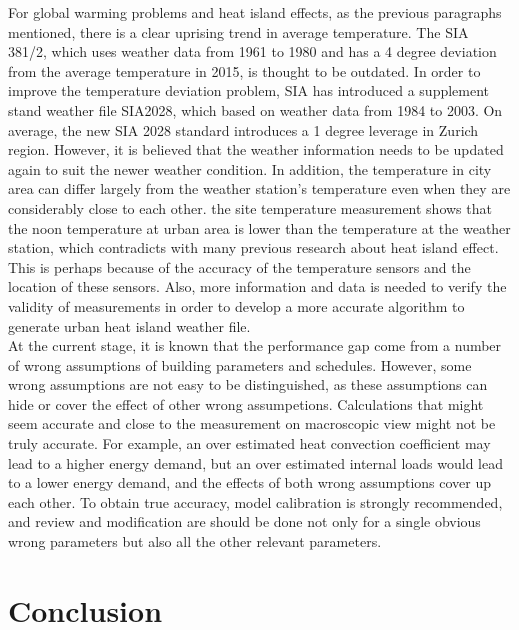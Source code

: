 \documentclass[a4paper, oneside]{discothesis}
\begin{document}
    For global warming problems and heat island effects, as the previous paragraphs mentioned, there is a clear uprising trend in average temperature. The SIA 381/2, which uses weather data from 1961 to 1980 and has a 4 degree deviation from the average temperature in 2015, is thought to be outdated. In order to improve the temperature deviation problem, SIA has introduced a supplement stand weather file SIA2028, which based on weather data from 1984 to 2003. On average, the new SIA 2028 standard introduces a 1 degree leverage in Zurich region. However, it is believed that the weather information needs to be updated again to suit the newer weather condition. In addition, the temperature in city area can differ largely from the weather station's temperature even when they are considerably close to each other. the site temperature measurement shows that the noon temperature at urban area is lower than the temperature at the weather station, which contradicts with many previous research about heat island effect. This is perhaps because of the accuracy of the temperature sensors and the location of these sensors. Also, more information and data is needed to verify the validity of measurements in order to develop a more accurate algorithm to generate urban heat island weather file.\\
    
    At the current stage, it is known that the performance gap come from a number of wrong assumptions of building parameters and schedules. However, some wrong assumptions are not easy to be distinguished, as these assumptions can hide or cover the effect of other wrong assumpetions. Calculations that might seem accurate and close to the measurement on macroscopic view might not be truly accurate. For example, an over estimated heat convection coefficient may lead to a higher energy demand, but an over estimated internal loads would lead to a lower energy demand, and the effects of both wrong assumptions cover up each other. To obtain true accuracy, model calibration is strongly recommended, and review and modification are should be done not only for a single obvious wrong parameters but also all the other relevant parameters.\\


\chapter{Conclusion}
    
\end{document}
